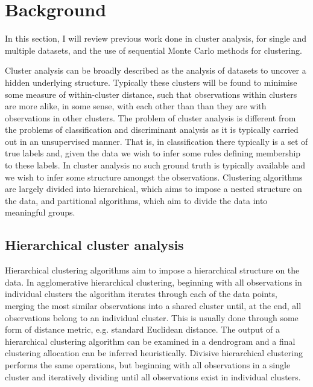 \documentclass[10pt,a4paper]{article}
\begin{document}
\section{Background}
\label{sec:background}
In this section, I will review previous work done in cluster analysis, for single and multiple datasets, and the use of sequential Monte Carlo methods for clustering.

Cluster analysis can be broadly described as the analysis of datasets to uncover a hidden underlying structure. Typically these clusters will be found to minimise some measure of within-cluster distance, such that observations within clusters are more alike, in some sense, with each other than than they are with observations in other clusters. The problem of cluster analysis is different from the problems of classification and discriminant analysis as it is typically carried out in an unsupervised manner. That is, in classification there typically is a set of true labels and, given the data we wish to infer some rules defining membership to these labels. In cluster analysis no such ground truth is typically available and we wish to infer some structure amongst the observations. Clustering algorithms are largely divided into hierarchical, which aims to impose a nested structure on the data, and partitional algorithms, which aim to divide the data into meaningful groups\cite{jain1988algorithms}. 


\subsection{Hierarchical cluster analysis}
Hierarchical clustering algorithms aim to impose a hierarchical structure on the data. In agglomerative hierarchical clustering, beginning with all observations in individual clusters the algorithm iterates through each of the data points, merging the most similar observations into a shared cluster until, at the end, all observations belong to an individual cluster. This is usually done through some form of distance metric, e.g. standard Euclidean distance. The output of a hierarchical clustering algorithm can be examined in a dendrogram and a final clustering allocation can be inferred heuristically. Divisive hierarchical clustering performs the same operations, but beginning with all observations in a single cluster and iteratively dividing until all observations exist in individual clusters.
\end{document}
